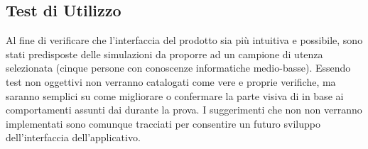 \clearpage
\subsection{Test di Utilizzo}
Al fine di verificare che l'interfaccia del prodotto sia più intuitiva e  possibile, sono stati predisposte delle simulazioni da proporre ad un campione di utenza selezionata (cinque persone con conoscenze informatiche medio-basse).
Essendo test non oggettivi non verranno catalogati come vere e proprie verifiche, ma saranno semplici  su come migliorare o confermare la parte visiva di \caName in base ai comportamenti assunti dai  durante la prova.
I suggerimenti che non non verranno implementati sono comunque tracciati per consentire un futuro sviluppo dell'interfaccia dell'applicativo.


